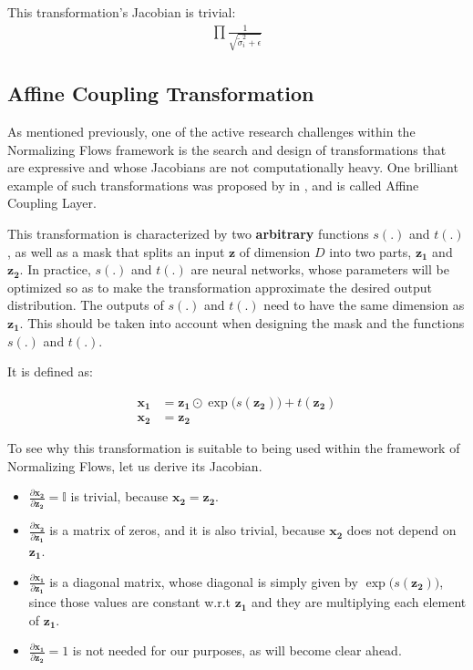 This transformation's Jacobian is trivial: 
\begin{align}
    \prod \frac{1}{\sqrt{{\tilde\sigma}_i^2 + \epsilon}}
\end{align}

\subsection{Affine Coupling Transformation}
As mentioned previously, one of the active research challenges within the
Normalizing Flows framework is the search and design of transformations that
are expressive and whose Jacobians are not computationally heavy. One brilliant
example of such transformations was proposed by \citeauthor{real-nvp} in
\cite{real-nvp}, and is called Affine Coupling Layer.

This transformation is characterized by two \textbf{arbitrary} functions $s(.)$ and
$t(.)$, as well as a mask that splits an input $\bm{z}$ of dimension $D$ into
two parts, $\bm{z_1}$ and $\bm{z_2}$. In practice, $s(.)$ and $t(.)$ are
neural networks, whose parameters will be optimized so as to make the transformation
approximate the desired output distribution. The outputs of $s(.)$ and $t(.)$
need to have the same dimension as $\bm{z_1}$. This should be taken into account when
designing the mask and the functions $s(.)$ and $t(.)$.

It is defined as:

\begin{align}
    \bm{x_1} &= \bm{z_1} \odot \exp\big(s(\bm{z_2})\big) + t(\bm{z_2}) \\
    \bm{x_2} &= \bm{z_2}
\end{align}

To see why this transformation is suitable to being used within the framework
of Normalizing Flows, let us derive its Jacobian.
\begin{itemize}
    \item $\frac{\partial \bm{x_2}}{\partial \bm{z_2}} = \mathbb{I}$ is trivial, because $\bm{x_2} = \bm{z_2}$.
    \item $\frac{\partial \bm{x_2}}{\partial \bm{z_1}}$ is a matrix of zeros, and it is also
        trivial, because $\bm{x_2}$ does not depend on $\bm{z_1}$.
    \item $\frac{\partial \bm{x_1}}{\partial \bm{z_1}}$ is a diagonal matrix,
        whose diagonal is simply given by $\exp\big(s(\bm{z_2})\big)$, since those values are
        constant w.r.t $\bm{z_1}$ and they are multiplying each element of $\bm{z_1}$.
    \item $\frac{\partial \bm{x_1}}{\partial \bm{z_2}} = 1$ is not needed for our purposes,
        as will become clear ahead.
\end{itemize}

